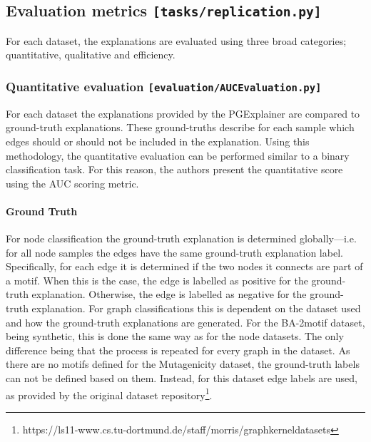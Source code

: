 
\subsection{Evaluation metrics \hfill \texttt{[tasks/replication.py]}}

For each dataset, the explanations are evaluated using three broad categories; quantitative, qualitative and efficiency.

\subsubsection{Quantitative evaluation \hfill \texttt{[evaluation/AUCEvaluation.py]}}
For each dataset the explanations provided by the PGExplainer are compared to ground-truth explanations. These ground-truths describe for each sample which edges should or should not be included in the explanation. Using this methodology, the quantitative evaluation can be performed similar to a binary classification task. For this reason, the authors present the quantitative score using the AUC scoring metric. 

\paragraph{Ground Truth }
For node classification the ground-truth explanation is determined globally---i.e. for all node samples the edges have the same ground-truth explanation label. Specifically, for each edge it is determined if the two nodes it connects are part of a motif. When this is the case, the edge is labelled as positive for the ground-truth explanation. Otherwise, the edge is labelled as negative for the ground-truth explanation. For graph classifications this is dependent on the dataset used and how the ground-truth explanations are generated. For the BA-2motif dataset, being synthetic, this is done the same way as for the node datasets. The only difference being that the process is repeated for every graph in the dataset. As there are no motifs defined for the Mutagenicity dataset, the ground-truth labels can not be defined based on them. Instead, for this dataset edge labels are used, as provided by the original dataset repository\footnote{https://ls11-www.cs.tu-dortmund.de/staff/morris/graphkerneldatasets}. 

